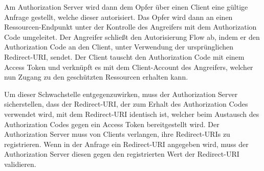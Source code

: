 Am Authorization Server wird dann dem Opfer über einen Client eine gültige Anfrage gestellt, welche dieser autorisiert. Das Opfer wird dann an einen Ressourcen-Endpunkt unter der Kontrolle des Angreifers mit dem Authorization Code umgeleitet. Der Angreifer schließt den Autorisierung Flow ab, indem er den Authorization Code an den Client, unter Verwendung der ursprünglichen Redirect-URI, sendet. Der Client tauscht den Authorization Code mit einem Access Token und verknüpft es mit dem Client-Account des Angreifers, welcher nun Zugang zu den geschützten Ressourcen erhalten kann. \cite{OAuthAuthorizationSecurityConsiderations}

Um dieser Schwachstelle entgegenzuwirken, muss der Authorization Server sicherstellen, dass der Redirect-URI, der zum Erhalt des Authorization Codes verwendet wird, mit dem Redirect-URI identisch ist, welcher beim Austausch des Authorization Codes gegen ein Access Token bereitgestellt wird. Der Authorization Server muss von Clients verlangen, ihre Redirect-URIs zu registrieren.  Wenn in der Anfrage ein Redirect-URI angegeben wird, muss der Authorization Server diesen gegen den registrierten Wert der Redirect-URI validieren. \cite{OAuthAuthorizationSecurityConsiderations}



